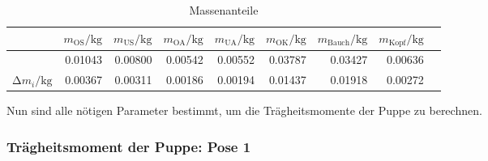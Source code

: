 \begin{table}
  \centering
  \caption{Massenanteile}
  \label{tab:Massenanteile}
  \begin{tabular}{rrrrrrrrr}
    \toprule
    & $m_{\text{OS}} / \unit{\kilo\gram}$ &     $m_{\text{US}} / \unit{\kilo\gram}$ &     $m_{\text{OA}} / \unit{\kilo\gram}$ &     $m_{\text{UA}} / \unit{\kilo\gram}$    &    $m_{\text{OK}} / \unit{\kilo\gram}$ &     $m_{\text{Bauch}} / \unit{\kilo\gram}$ & $m_{\text{Kopf}} / \unit{\kilo\gram}$ \\
    \midrule
    & 0.01043 & 0.00800 & 0.00542 & 0.00552 & 0.03787 & 0.03427 & 0.00636 \\
    $\increment m_i / \unit{\kilo\gram}$ & 0.00367 & 0.00311 & 0.00186 & 0.00194 & 0.01437 & 0.01918 & 0.00272 \\ 
    \bottomrule
  \end{tabular}
\end{table}


Nun sind alle nötigen Parameter bestimmt, um die Trägheitsmomente der Puppe zu berechnen.

\subsubsection{Trägheitsmoment der Puppe: Pose 1}

